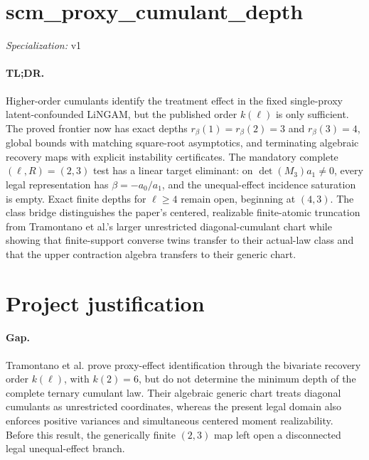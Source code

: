 \documentclass{article}
\begin{document}
\sloppy

\section*{scm\_\allowbreak{}proxy\_\allowbreak{}cumulant\_\allowbreak{}depth}

\noindent\textit{Specialization:} v1\par

\paragraph{TL;DR.} Higher-order cumulants identify the treatment effect in the fixed single-proxy latent-confounded LiNGAM, but the published order \(k(\ell)\) is only sufficient. The proved frontier now has exact depths \(r_\beta(1)=r_\beta(2)=3\) and \(r_\beta(3)=4\), global bounds with matching square-root asymptotics, and terminating algebraic recovery maps with explicit instability certificates. The mandatory complete \((\ell,R)=(2,3)\) test has a linear target eliminant: on \(\det(M_3)a_1\ne0\), every legal representation has \(\beta=-a_0/a_1\), and the unequal-effect incidence saturation is empty. Exact finite depths for \(\ell\ge4\) remain open, beginning at \((4,3)\). The class bridge distinguishes the paper's centered, realizable finite-atomic truncation from Tramontano et al.'s larger unrestricted diagonal-cumulant chart while showing that finite-support converse twins transfer to their actual-law class and that the upper contraction algebra transfers to their generic chart.

\section{Project justification}

\paragraph{Gap.} Tramontano et al. prove proxy-effect identification through the bivariate recovery order \(k(\ell)\), with \(k(2)=6\), but do not determine the minimum depth of the complete ternary cumulant law. Their algebraic generic chart treats diagonal cumulants as unrestricted coordinates, whereas the present legal domain also enforces positive variances and simultaneous centered moment realizability. Before this result, the generically finite \((2,3)\) map left open a disconnected legal unequal-effect branch.
\end{document}
